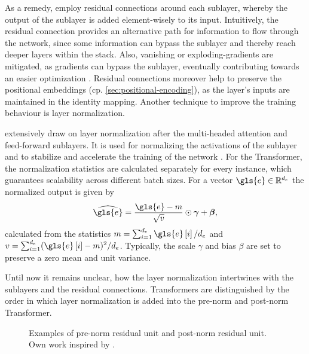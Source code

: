 As a remedy, \textcite[][3]{vaswaniAttentionAllYou2017} employ residual connections around each sublayer, whereby the output of the sublayer is added element-wisely to its input. Intuitively, the residual connection provides an alternative path for information to flow through the network, since some information can bypass the sublayer and thereby reach deeper layers within the stack. Also, vanishing or \glspl{exploding-gradient} are mitigated, as gradients can bypass the sublayer, eventually contributing towards an easier optimization \autocite[][3591]{liuRethinkingSkipConnection2020}. Residual connections moreover help to preserve the positional embeddings (cp. \cref{sec:positional-encoding}), as the layer's inputs are maintained in the identity mapping. Another technique to improve the training behaviour is layer normalization.

\textcite[][3]{vaswaniAttentionAllYou2017} extensively draw on layer normalization \autocite[][4]{baLayerNormalization2016} after the multi-headed attention and feed-forward sublayers. It is used for normalizing the activations of the sublayer and to stabilize and accelerate the training of the network \autocite[][2]{baLayerNormalization2016}. For the Transformer, the normalization statistics are calculated separately for every instance, which guarantees scalability across different batch sizes. For a vector $\gls{e}\in \mathbb{R}^{d_e}$ the normalized output is given by
\begin{equation}
\widehat{\gls{e}}=\frac{\gls{e}-m}{\sqrt{v}} \odot \boldsymbol{\gamma}+\boldsymbol{\beta},
\end{equation}
calculated from the statistics $m = \sum_{i=1}^{d_{e}} \gls{e}\left[i\right] / d_{e}$ and $v = \sum_{i=1}^{d_{e}}(\gls{e}\left[i\right]-m)^2 / d_{e}$. Typically, the scale $\gamma$ and bias $\beta$ are set to preserve a zero mean and unit variance.

Until now it remains unclear, how the layer normalization intertwines with the sublayers and the residual connections. Transformers are distinguished by the order in which layer normalization is added into the pre-norm and post-norm Transformer.
\begin{figure}[ht]
\hfill
{}
\hfill
{}
\hfill\null
\caption[Pre-norm residual unit and post-norm residual unit]{Examples of pre-norm residual unit and post-norm residual unit. Own work inspired by \textcite[][2]{wangLearningDeepTransformer2019}.}
\label{fig:norm-residual}
\end{figure}

